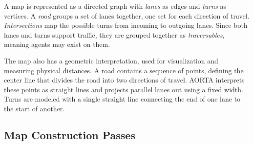 \documentclass[letterpaper, 10 pt, conference]{ieeeconf}  %
\begin{document}

A map is represented as a directed graph with \emph{lanes} as edges and
\emph{turns} as vertices. A \emph{road} groups a set of lanes together, one set
for each direction of travel. \emph{Intersections} map the possible turns from
incoming to outgoing lanes.  Since both lanes and turns support traffic, they
are grouped together as \emph{traversables}, meaning agents may exist on them.

The map also has a geometric interpretation, used for visualization and
measuring physical distances. A road contains a sequence of points, defining
the center line that divides the road into two directions of travel. AORTA
interprets these points as straight lines and projects parallel lanes out using
a fixed width. Turns are modeled with a single straight line connecting the end
of one lane to the start of another. 

\subsection{Map Construction Passes}
\label{sec:mapconstruction}
\end{document}
